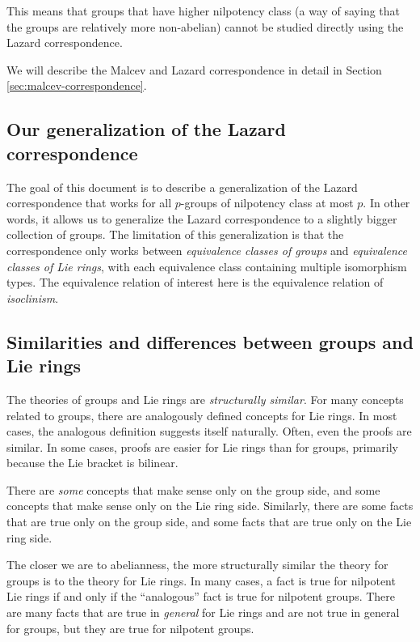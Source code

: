 \documentclass{ucetd}
\begin{document}
This means that groups that have higher nilpotency class (a
way of saying that the groups are relatively more non-abelian) cannot
be studied directly using the Lazard correspondence.

We will describe the Malcev and Lazard correspondence in detail in
Section \ref{sec:malcev-correspondence}.

\subsection{Our generalization of the Lazard correspondence}

The goal of this document is to describe a generalization of the
Lazard correspondence that works for all $p$-groups of nilpotency
class at most $p$. In other words, it allows us to generalize the
Lazard correspondence to a slightly bigger collection of groups. The
limitation of this generalization is that the correspondence only works
between {\em equivalence classes of groups} and {\em equivalence
  classes of Lie rings}, with each equivalence class containing
multiple isomorphism types. The equivalence relation of interest here
is the equivalence relation of {\em isoclinism}.

\subsection{Similarities and differences between groups and Lie rings}

The theories of groups and Lie rings are {\em structurally
  similar}. For many concepts related to groups, there are analogously
defined concepts for Lie rings. In most cases, the analogous
definition suggests itself naturally. Often, even the proofs are
similar. In some cases, proofs are easier for Lie rings than for
groups, primarily because the Lie bracket is bilinear.

There are {\em some} concepts that make sense only on the group side,
and some concepts that make sense only on the Lie ring
side. Similarly, there are some facts that are true only on the group
side, and some facts that are true only on the Lie ring side.

The closer we are to abelianness, the more structurally similar the
theory for groups is to the theory for Lie rings. In many cases, a
fact is true for nilpotent Lie rings if and only if the ``analogous''
fact is true for nilpotent groups. There are many facts that are true
in {\em general} for Lie rings and are not true in general for groups,
but they are true for nilpotent groups.
\end{document}
